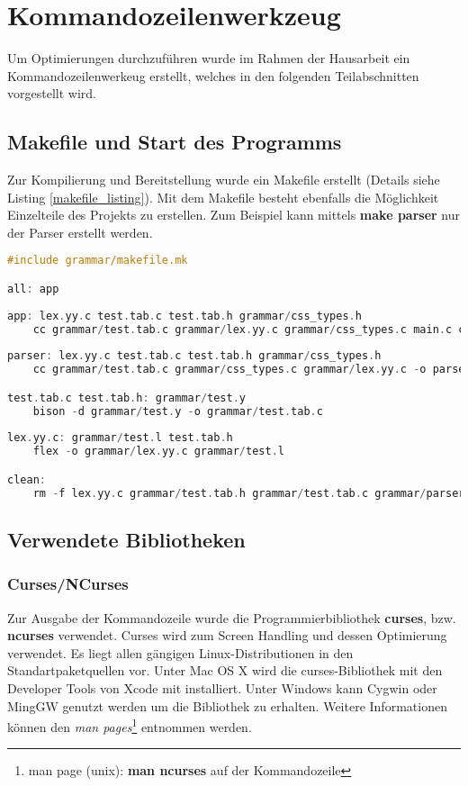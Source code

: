 \section{Kommandozeilenwerkzeug}
Um Optimierungen durchzuführen wurde im Rahmen der Hausarbeit ein Kommandozeilenwerkeug erstellt, welches in den folgenden Teilabschnitten vorgestellt wird.

\subsection{Makefile und Start des Programms}
Zur Kompilierung und Bereitstellung wurde ein Makefile erstellt (Details siehe Listing \ref{makefile_listing}). Mit dem Makefile besteht ebenfalls die Möglichkeit Einzelteile des Projekts zu erstellen. Zum Beispiel kann mittels \textbf{make parser} nur der Parser erstellt werden.
\begin{lstlisting}[label=makefile_listing,language=C, caption=Makefile]
#include grammar/makefile.mk

all: app
	
app: lex.yy.c test.tab.c test.tab.h grammar/css_types.h
	cc grammar/test.tab.c grammar/lex.yy.c grammar/css_types.c main.c cli_parse.c css_merge.c guiCSS.c optimizer.c output.c -lncurses -o optimCSS
	
parser: lex.yy.c test.tab.c test.tab.h grammar/css_types.h
	cc grammar/test.tab.c grammar/css_types.c grammar/lex.yy.c -o parser

test.tab.c test.tab.h: grammar/test.y
	bison -d grammar/test.y -o grammar/test.tab.c
            
lex.yy.c: grammar/test.l test.tab.h
	flex -o grammar/lex.yy.c grammar/test.l

clean: 
	rm -f lex.yy.c grammar/test.tab.h grammar/test.tab.c grammar/parser optimCSS
\end{lstlisting}

\subsection{Verwendete Bibliotheken}

\subsubsection{Curses/NCurses}

Zur Ausgabe der Kommandozeile wurde die Programmierbibliothek \textbf{curses}, bzw. \textbf{ncurses} verwendet. Curses wird zum Screen Handling und dessen Optimierung verwendet. Es liegt allen gängigen Linux-Distributionen in den Standartpaketquellen vor. Unter Mac OS X wird die curses-Bibliothek mit den Developer Tools von Xcode mit installiert. Unter Windows kann Cygwin oder MingGW genutzt werden um die Bibliothek zu erhalten. Weitere Informationen können den \textit{man pages}\footnote{man page (unix): \textbf{man ncurses} auf der Kommandozeile} entnommen werden. 

